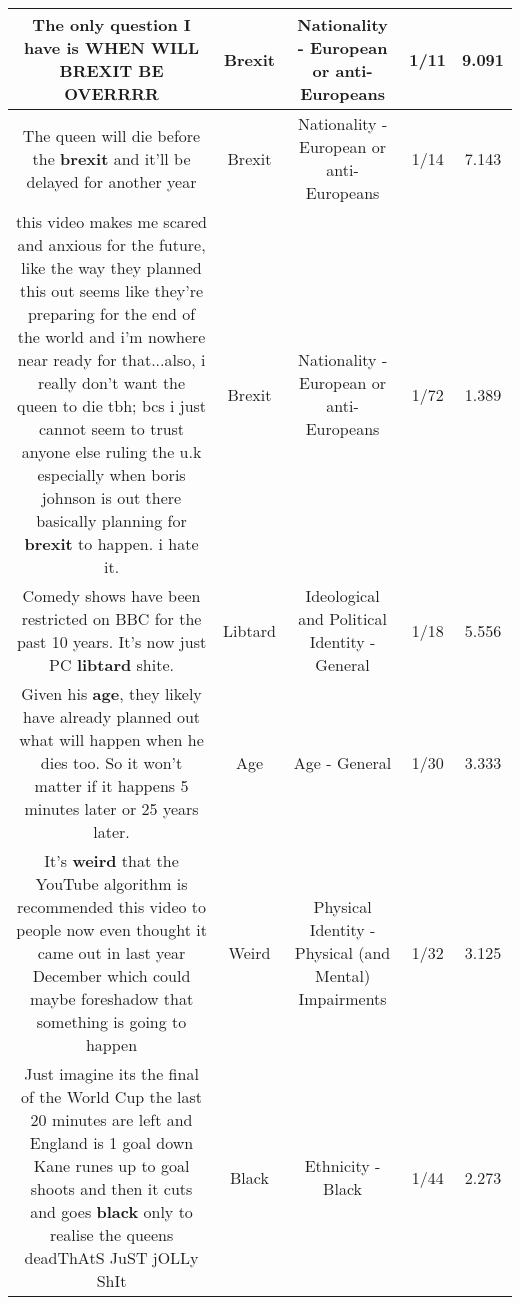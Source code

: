 \documentclass[11pt]{article}
\newlength\mylength
\begin{document}
\begin{center}
\begin{longtable}{|C{.65\mylength}|C{.30\mylength}|C{.12\mylength}|C{.12\mylength}|C{.12\mylength}|}
  \small The only question I have is WHEN WILL \textbf{BREXIT} BE OVERRRR\normalsize   & Brexit & Nationality - European or anti-Europeans & 1/11 & 9.091 \\  \hline
  \small The queen will die before the \textbf{brexit} and it'll be delayed for another year\normalsize   & Brexit & Nationality - European or anti-Europeans & 1/14 & 7.143 \\  \hline
  \small this video makes me scared and anxious for the future, like the way they planned this out seems like they're preparing for the end of the world and i'm nowhere near ready for that...also, i really don't want the queen to die tbh; bcs i just cannot seem to trust anyone else ruling the u.k especially when boris johnson is out there basically planning for \textbf{brexit} to happen. i hate it.\normalsize   & Brexit & Nationality - European or anti-Europeans & 1/72 & 1.389 \\  \hline
  \small Comedy shows have been restricted on BBC for the past 10 years. It's now just PC \textbf{libtard} shite.\normalsize   & Libtard &  Ideological and Political Identity - General & 1/18 & 5.556 \\  \hline
  \small Given his \textbf{age}, they likely have already planned out what will happen when he dies too. So it won't matter if it happens 5 minutes later or 25 years later.\normalsize   & Age & Age - General & 1/30 & 3.333 \\  \hline
  \small It's \textbf{weird} that the YouTube algorithm is recommended this video to people now even thought it came out in last year December which could maybe foreshadow that something is going to happen\normalsize   & Weird & Physical Identity - Physical (and Mental) Impairments & 1/32 & 3.125 \\  \hline
  \small Just imagine its the final of the World Cup the last 20 minutes are left and England is 1 goal down Kane runes up to goal shoots and then it cuts and goes \textbf{black} only to realise the queens deadThAtS JuST jOLLy ShIt\normalsize   & Black & Ethnicity - Black & 1/44 & 2.273 \\  \hline

\end{longtable}
\end{center}
\end{document}
